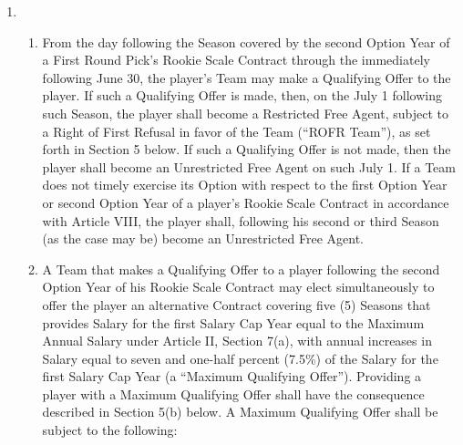 \documentclass[
]{book}
\providecommand{\tightlist}{%
  \setlength{\itemsep}{0pt}\setlength{\parskip}{0pt}}
\begin{document}
\begin{enumerate}
\def\labelenumi{(\alph{enumi})}
\item
  \begin{enumerate}
  \def\labelenumii{(\roman{enumii})}
  \tightlist
  \item
    From the day following the Season covered by the second Option Year of a First Round Pick's Rookie Scale Contract through the immediately following June 30, the player's Team may make a Qualifying Offer to the player. If such a Qualifying Offer is made, then, on the July 1 following such Season, the player shall become a Restricted Free Agent, subject to a Right of First Refusal in favor of the Team (``ROFR Team''), as set forth in Section 5 below. If such a Qualifying Offer is not made, then the player shall become an Unrestricted Free Agent on such July 1. If a Team does not timely exercise its Option with respect to the first Option Year or second Option Year of a player's Rookie Scale Contract in accordance with Article VIII, the player shall, following his second or third Season (as the case may be) become an Unrestricted Free Agent.
  \item
    A Team that makes a Qualifying Offer to a player following the second Option Year of his Rookie Scale Contract may elect simultaneously to offer the player an alternative Contract covering five (5) Seasons that provides Salary for the first Salary Cap Year equal to the Maximum Annual Salary under Article II, Section 7(a), with annual increases in Salary equal to seven and one-half percent (7.5\%) of the Salary for the first Salary Cap Year (a ``Maximum Qualifying Offer''). Providing a player with a Maximum Qualifying Offer shall have the consequence described in Section 5(b) below. A Maximum Qualifying Offer shall be subject to the following:


\end{enumerate}
\end{enumerate}
\end{document}
